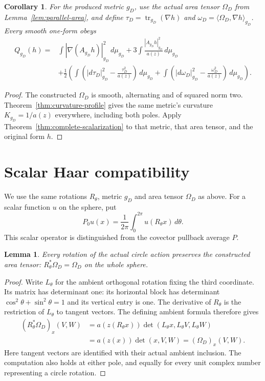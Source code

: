 \documentclass[11pt]{article}
\newtheorem{lemma}[theorem]{Lemma}
\newtheorem{corollary}[theorem]{Corollary}
\begin{document}
\begin{corollary}\label{cor:rotational-scalarization}
For the produced metric $g_D$, use the actual area tensor $\Omega_D$ from
Lemma~\ref{lem:parallel-area}, and define
$\tau_D=\operatorname{tr}_{g_D}(\nabla h)$ and
$\omega_D=\langle\Omega_D,\nabla h\rangle_{g_D}$. Every smooth one-form obeys
\[
 \begin{split}
 Q_{g_D}(h)={}&\int|\nabla(A_{g_D}h)|_{g_D}^2\,d\mu_{g_D}
        +3\int\frac{|A_{g_D}h|_{g_D}^2}{a(z)}\,d\mu_{g_D}\\
 &+\frac12\left(
    \int\left(|d\tau_D|_{g_D}^2-\frac{\tau_D^2}{a(z)}\right)\,d\mu_{g_D}
   +\int\left(|d\omega_D|_{g_D}^2-\frac{\omega_D^2}{a(z)}\right)\,d\mu_{g_D}
              \right).
 \end{split}
\]
\end{corollary}

\begin{proof}
The constructed $\Omega_D$ is smooth, alternating and of squared norm two.
Theorem~\ref{thm:curvature-profile} gives the same metric's curvature
$K_{g_D}=1/a(z)$ everywhere, including both poles. Apply
Theorem~\ref{thm:complete-scalarization} to that metric, that area tensor,
and the original form $h$.
\end{proof}

\section{Scalar Haar compatibility}

We use the same rotations $R_\theta$, metric $g_D$ and area tensor $\Omega_D$
as above. For a scalar function $u$ on the sphere, put
\begin{equation}\label{eq:scalar-haar-average}
 P_0u(x)=\frac{1}{2\pi}\int_0^{2\pi}u(R_\theta x)\,d\theta.
\end{equation}
This scalar operator is distinguished from the covector pullback average $P$.

\begin{lemma}\label{lem:rotation-area-invariance}
Every rotation of the actual circle action preserves the constructed area tensor:
$R_\theta^*\Omega_D=\Omega_D$ on the whole sphere.
\end{lemma}

\begin{proof}
Write $L_\theta$ for the ambient orthogonal rotation fixing the third coordinate.
Its matrix has determinant one: its horizontal block has determinant
$\cos^2\theta+\sin^2\theta=1$ and its vertical entry is one.
The derivative of $R_\theta$ is the restriction of $L_\theta$ to tangent vectors.
The defining ambient formula therefore gives
\[
 \begin{split}
 (R_\theta^*\Omega_D)_x(V,W)
 &=a(z(R_\theta x))
       \det(L_\theta x,L_\theta V,L_\theta W)\\
 &=a(z(x))\det(x,V,W)=(\Omega_D)_x(V,W).
 \end{split}
\]
Here tangent vectors are identified with their actual ambient inclusion.
The computation also holds at either pole, and equally for every unit complex
number representing a circle rotation.
\end{proof}
\end{document}
